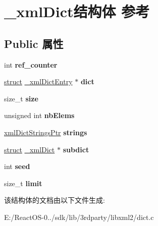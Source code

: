 \hypertarget{struct__xml_dict}{}\section{\+\_\+xml\+Dict结构体 参考}
\label{struct__xml_dict}
\subsection*{Public 属性}
\begin{DoxyCompactItemize}
\item 
\mbox{\label{struct__xml_dict_a621007f2c0e2dfa8c6b2254362993b6b}} 
int {\bfseries ref\+\_\+counter}
\item 
\mbox{\label{struct__xml_dict_a24009f3113bebc8f3cad21327680433b}} 
\hyperlink{interfacestruct}{struct} \hyperlink{struct__xml_dict_entry}{\+\_\+xml\+Dict\+Entry} $\ast$ {\bfseries dict}
\item 
\mbox{\label{struct__xml_dict_ad76d66ecc60fd308d598efd2310d7774}} 
size\+\_\+t {\bfseries size}
\item 
\mbox{\label{struct__xml_dict_a689f0483ae951f3a288078ea97f732dd}} 
unsigned int {\bfseries nb\+Elems}
\item 
\mbox{\label{struct__xml_dict_a3f38eb554703d6fe9e217b6642227835}} 
\hyperlink{struct__xml_dict_strings}{xml\+Dict\+Strings\+Ptr} {\bfseries strings}
\item 
\mbox{\label{struct__xml_dict_a4bfaf29c3961e1b71cd6d0d853ff2748}} 
\hyperlink{interfacestruct}{struct} \hyperlink{struct__xml_dict}{\+\_\+xml\+Dict} $\ast$ {\bfseries subdict}
\item 
\mbox{\label{struct__xml_dict_aeafed14f7462e755bd1b7e68e8217fe3}} 
int {\bfseries seed}
\item 
\mbox{\label{struct__xml_dict_a3e8de2fc2c7a6b4c14c06ffe280e3da9}} 
size\+\_\+t {\bfseries limit}
\end{DoxyCompactItemize}


该结构体的文档由以下文件生成\+:\begin{DoxyCompactItemize}
\item 
E\+:/\+React\+O\+S-\/0../sdk/lib/3rdparty/libxml2/dict.\+c\end{DoxyCompactItemize}
